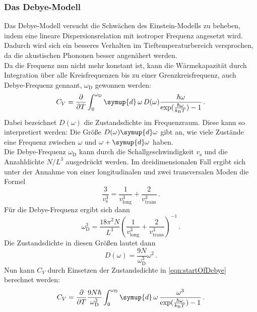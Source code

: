 \subsubsection{Das Debye-Modell}
Das Debye-Modell versucht die Schwächen des Einstein-Modells zu beheben, indem eine lineare Dispersionsrelation mit isotroper Frequenz angesetzt wird. Dadurch wird sich ein besseres Verhalten im Tieftemperaturbereich versprochen, da die akustischen Phononen besser angenähert werden.\\
Da die Frequenz nun nicht mehr konstant ist, kann die Wärmekapazität durch Integration über alle Kreisfrequenzen bis zu einer Grenzkreisfrequenz, auch Debye-Frequenz gennant, $\omega_\text{D}$ gewonnen werden:
\begin{equation}
  C_V = \frac{\partial}{\partial T} \int_0^{\omega_\text{D}} \symup{d}\,\omega \, D(\omega) \frac{\hbar \omega}{\exp(\frac{\hbar \omega}{k_\text{B} T}) - 1}\,.
  \label{eqn:startOfDebye}
\end{equation}
Dabei bezeichnet $D(\omega)$ die Zustandsdichte im Frequenzraum. Diese kann so interpretiert werden: Die Größe $D(\omega) \symup{d}\omega$ gibt an, wie viele Zustände eine Frequenz zwischen $\omega$ und $\omega + \symup{d}\omega$ haben.\\
Die Debye-Frequenz $\omega_\text{D}$ kann durch die Schallgeschwindigkeit $v_\text{s}$ und die Anzahldichte $N/L^3$ ausgedrückt werden. Im dreidimensionalen Fall ergibt sich unter der Annahme von einer longitudinalen und zwei transversalen Moden die Formel
\begin{equation}
  \frac{3}{v_\text{s}^3} = \frac{1}{v_\text{long}^3} + \frac{2}{v_\text{trans}^3}\,.
  \label{eqn:schallgeschwindigkeit}
\end{equation}
Für die Debye-Frequenz ergibt sich dann
\begin{equation}
  \omega_{\text{D}}^3 = \frac{18 \pi^2 N}{L^3} \left( \frac{1}{v_\text{long}^3} + \frac{2}{v_\text{trans}^3} \right)^{-1}\,.
  \label{eqn:debyeFrequenz}
\end{equation}
Die Zustandsdichte in diesen Größen lautet dann
\begin{equation}
  D(\omega) = \frac{9 N}{\omega_\text{D}^3} \omega^2\,.
  \label{eqn:zustandsdichte}
\end{equation}
Nun kann $C_V$ durch Einsetzen der Zustandsdichte in \eqref{eqn:startOfDebye} berechnet werden:
\begin{equation}
  C_V = \frac{\partial}{\partial T} \frac{9 N \hbar}{\omega_\text{D}^3} \int_0^{\omega_\text{D}} \symup{d}\,\omega \, \frac{\omega^3}{\exp(\frac{\hbar \omega}{k_\text{B} T}) - 1}\,.
\end{equation}
